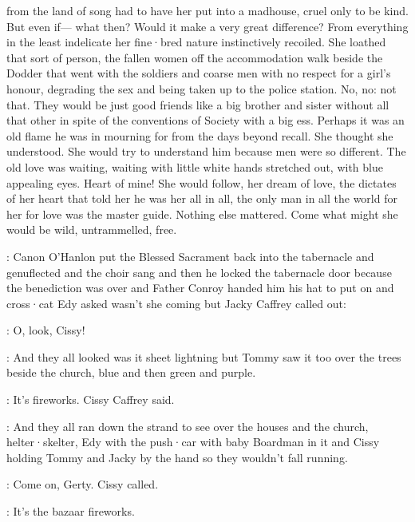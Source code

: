 from the land of song
had to have her put into a madhouse,
cruel only to be kind.
But even if—%
what then?
Would it make a very great difference?
From everything in the least indelicate
her fine·bred nature instinctively recoiled.
She loathed that sort of person,
the fallen women
off the accommodation walk beside the Dodder
that went with the soldiers
and coarse men
with no respect for a girl's honour,
degrading the sex
and being taken up to the police station.
No,
no:
not that.
They would be just good friends
like a big brother and sister
without all that other
in spite of the conventions of Society
with a big ess.
Perhaps it was an old flame
he was in mourning for
from the days beyond recall.
She thought she understood.
She would try to understand him
because men were so different.
The old love was waiting,
waiting
with little white hands stretched out,
with blue appealing eyes.
Heart of mine!
She would follow,
her dream of love,
the dictates of her heart
that told her
he was her all in all,
the only man in all the world
for her
for love was the master guide.
Nothing else mattered.
Come what might
she would be wild,
untrammelled,
free.

:
Canon O'Hanlon
put the Blessed Sacrament
back into the tabernacle
and genuflected
and the choir sang 
and then he locked the tabernacle door
because the benediction was over
and Father Conroy handed him his hat
to put on
and cross·cat Edy asked
wasn't she coming
but Jacky Caffrey called out:

\jacky:
O,
look,
Cissy!

:
And they all looked
was it sheet lightning
but Tommy saw it too
over the trees beside the church,
blue
and then green
and purple.

\cissy:
It's fireworks.
Cissy Caffrey said.

:
And they all ran down the strand
to see over the houses
and the church,
helter·skelter,
Edy with the push·car
with baby Boardman in it
and Cissy holding Tommy and Jacky by the hand
so they wouldn't fall running.

\cissy:
Come on,
Gerty.
Cissy called.

\cissy:
It's the bazaar fireworks.

